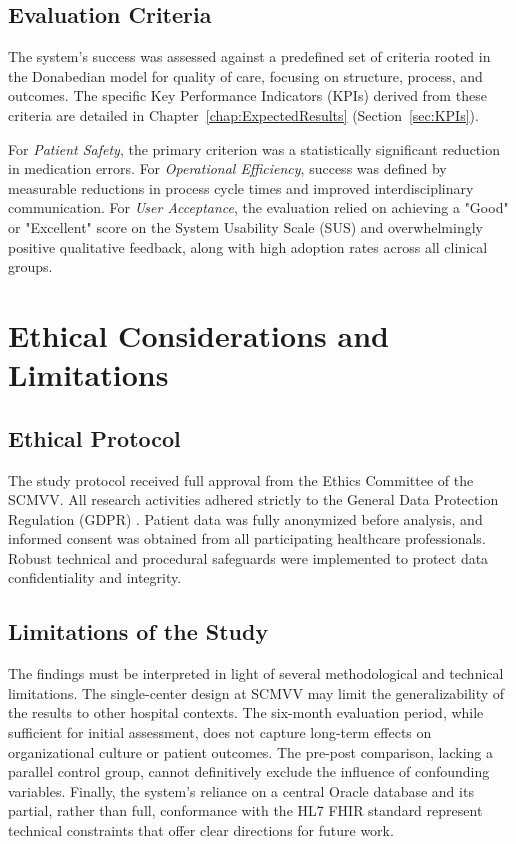 \subsection{Evaluation Criteria}
The system's success was assessed against a predefined set of criteria rooted in the Donabedian model for quality of care, focusing on structure, process, and outcomes. The specific Key Performance Indicators (KPIs) derived from these criteria are detailed in Chapter~\ref{chap:ExpectedResults} (Section~\ref{sec:KPIs}).

For \textit{Patient Safety}, the primary criterion was a statistically significant reduction in medication errors. For \textit{Operational Efficiency}, success was defined by measurable reductions in process cycle times and improved interdisciplinary communication. For \textit{User Acceptance}, the evaluation relied on achieving a "Good" or "Excellent" score on the System Usability Scale (SUS) and overwhelmingly positive qualitative feedback, along with high adoption rates across all clinical groups.

\section{Ethical Considerations and Limitations}

\subsection{Ethical Protocol}
The study protocol received full approval from the Ethics Committee of the SCMVV. All research activities adhered strictly to the General Data Protection Regulation (GDPR) \cite{european2016}. Patient data was fully anonymized before analysis, and informed consent was obtained from all participating healthcare professionals. Robust technical and procedural safeguards were implemented to protect data confidentiality and integrity.

\subsection{Limitations of the Study}
The findings must be interpreted in light of several methodological and technical limitations. The single-center design at SCMVV may limit the generalizability of the results to other hospital contexts. The six-month evaluation period, while sufficient for initial assessment, does not capture long-term effects on organizational culture or patient outcomes. The pre-post comparison, lacking a parallel control group, cannot definitively exclude the influence of confounding variables. Finally, the system's reliance on a central Oracle database and its partial, rather than full, conformance with the HL7 FHIR standard represent technical constraints that offer clear directions for future work.